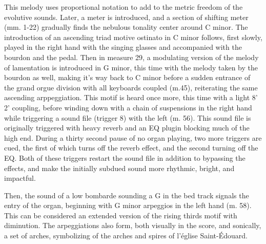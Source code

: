 \documentclass[12pt,twoside,maitrise]{dms_ks}
\theoremstyle{definition}
\begin{document}
{

This melody uses proportional notation to add to the metric freedom of the evolutive sounds. Later, a meter is introduced, and a section of shifting meter (mm. 1-22) gradually finds the nebulous tonality center around C minor.
The introduction of an ascending triad motive ostinato in C minor follows, first slowly, played in the right hand with the singing glasses and accompanied with the bourdon and the pedal. Then in measure 29, a modulating version of the melody of lamentation is introduced in G minor, this time with the melody taken by the bourdon as well, making it's way back to C minor before a sudden entrance of the grand orgue division with all keyboards coupled (m.45), reiterating the same ascending arppeggiation. This motif is heard once more, this time with a light 8' 2' coupling, before winding down with a chain of suspensions in the right hand while triggering a sound file (trigger 8) with the left (m. 56). This sound file is originally triggered with heavy reverb and an EQ plugin blocking much of the high end. During a thirty second pause of no organ playing, two more triggers are cued, the first of which turns off the reverb effect, and the second turning off the EQ. Both of these triggers restart the sound file in addition to bypassing the effects, and make the initially subdued sound more rhythmic, bright, and impactful. 



Then, the sound of a low bombarde sounding a G in the bed track signals the entry of the organ, beginning with G minor arpeggios in the left hand (m. 58). This can be considered an extended version of the rising thirds motif with diminution. 
The arpeggiations also form, both visually in the score, and sonically, a set of arches, symbolizing of the arches and spires of l'église Saint-Édouard.


}
\end{document}

